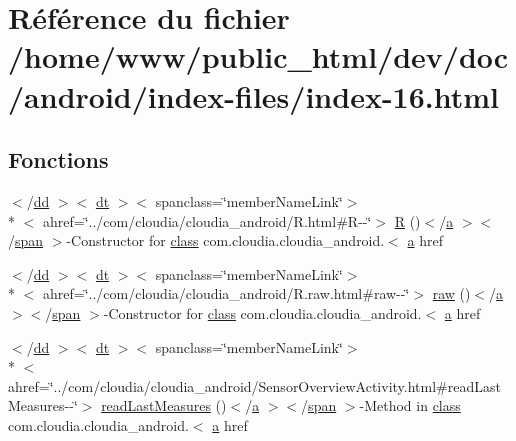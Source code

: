 \hypertarget{index-16_8html}{\section{Référence du fichier /home/www/public\-\_\-html/dev/doc/android/index-\/files/index-\/16.html}
\label{index-16_8html}
}
\subsection*{Fonctions}
\begin{DoxyCompactItemize}
\item 
$<$/\hyperlink{stylesheet_8css_a47f4718a86835a7771ec592ece845221}{dd} $>$$<$ \hyperlink{stylesheet_8css_a107565fb4039d33b041380d6e0ea1d80}{dt} $>$$<$ spanclass=\char`\"{}member\-Name\-Link\char`\"{}$>$\\*
$<$ ahref=\char`\"{}../com/cloudia/cloudia\-\_\-android/R.\-html\#R-\/-\/\char`\"{}$>$ \hyperlink{index-16_8html_a31e8fe59be5c20ce90a0090e28a0c1fe}{R} ()$<$/\hyperlink{style_8css_a5e8981582017bb8b84c21f148345d1f7}{a} $>$$<$/\hyperlink{stylesheet_8css_a8343996ebcf16220b04e54659aac31cc}{span} $>$-\/Constructor for \hyperlink{_tools_8html_acf06f836132665ba8114f5a414c2403f}{class} com.\-cloudia.\-cloudia\-\_\-android.$<$ \hyperlink{style_8css_a5e8981582017bb8b84c21f148345d1f7}{a} href
\item 
$<$/\hyperlink{stylesheet_8css_a47f4718a86835a7771ec592ece845221}{dd} $>$$<$ \hyperlink{stylesheet_8css_a107565fb4039d33b041380d6e0ea1d80}{dt} $>$$<$ spanclass=\char`\"{}member\-Name\-Link\char`\"{}$>$\\*
$<$ ahref=\char`\"{}../com/cloudia/cloudia\-\_\-android/R.\-raw.\-html\#raw-\/-\/\char`\"{}$>$ \hyperlink{index-16_8html_ae84fa9c4fed0bf708a919a3728c8e4de}{raw} ()$<$/\hyperlink{style_8css_a5e8981582017bb8b84c21f148345d1f7}{a} $>$$<$/\hyperlink{stylesheet_8css_a8343996ebcf16220b04e54659aac31cc}{span} $>$-\/Constructor for \hyperlink{_tools_8html_acf06f836132665ba8114f5a414c2403f}{class} com.\-cloudia.\-cloudia\-\_\-android.$<$ \hyperlink{style_8css_a5e8981582017bb8b84c21f148345d1f7}{a} href
\item 
$<$/\hyperlink{stylesheet_8css_a47f4718a86835a7771ec592ece845221}{dd} $>$$<$ \hyperlink{stylesheet_8css_a107565fb4039d33b041380d6e0ea1d80}{dt} $>$$<$ spanclass=\char`\"{}member\-Name\-Link\char`\"{}$>$\\*
$<$ ahref=\char`\"{}../com/cloudia/cloudia\-\_\-android/Sensor\-Overview\-Activity.\-html\#read\-Last\-Measures-\/-\/\char`\"{}$>$ \hyperlink{index-16_8html_a00f421ed7ff1f2271ed07617bbbec0f4}{read\-Last\-Measures} ()$<$/\hyperlink{style_8css_a5e8981582017bb8b84c21f148345d1f7}{a} $>$$<$/\hyperlink{stylesheet_8css_a8343996ebcf16220b04e54659aac31cc}{span} $>$-\/Method in \hyperlink{_tools_8html_acf06f836132665ba8114f5a414c2403f}{class} com.\-cloudia.\-cloudia\-\_\-android.$<$ \hyperlink{style_8css_a5e8981582017bb8b84c21f148345d1f7}{a} href
$$
\end{DoxyCompactItemize}
